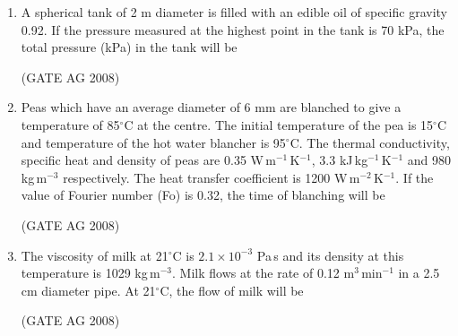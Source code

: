 \documentclass[journal,12pt,onecolumn]{IEEEtran}
\begin{document}
\begin{enumerate}
\medskip

\item 
 A spherical tank of 2 m diameter is filled with an edible oil of specific gravity 0.92. If the pressure measured at the highest point in the tank is 70 kPa, the total pressure (kPa) in the tank will be
\begin{enumerate}
\end{enumerate}
\hfill(GATE AG 2008)\\

\medskip


\item 
 Peas which have an average diameter of 6 mm are blanched to give a temperature of 85${}^\circ$C at the centre. The initial temperature of the pea is 15${}^\circ$C and temperature of the hot water blancher is 95${}^\circ$C. The thermal conductivity, specific heat and density of peas are 0.35 W\,m$^{-1}$\,K$^{-1}$, 3.3 kJ\,kg$^{-1}$\,K$^{-1}$ and 980 kg\,m$^{-3}$ respectively. The heat transfer coefficient is 1200 W\,m$^{-2}$\,K$^{-1}$. If the value of Fourier number (Fo) is 0.32, the time of blanching will be
\begin{enumerate}
\end{enumerate}
\hfill(GATE AG 2008)\\

\medskip

\item 
 The viscosity of milk at 21${}^\circ$C is $2.1 \times 10^{-3}$ Pa\,s and its density at this temperature is 1029 kg\,m$^{-3}$. Milk flows at the rate of 0.12 m$^3$\,min$^{-1}$ in a 2.5 cm diameter pipe. At 21${}^\circ$C, the flow of milk will be
\begin{enumerate}
\end{enumerate}
\hfill(GATE AG 2008)\\


\end{enumerate}
\end{document}
